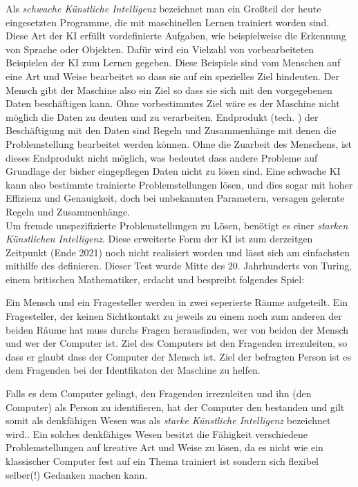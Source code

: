 \documentclass[12pt]{report}
\begin{document}
    Als \emph{schwache Künstliche Intelligenz} bezeichnet man ein Großteil der heute eingesetzten Programme, die mit
    maschinellen Lernen trainiert worden sind.\cite{ibm2021whatisAI} Diese Art der KI erfüllt vordefinierte Aufgaben,
    wie beispielweise die Erkennung von Sprache oder Objekten. Dafür wird ein Vielzahl von vorbearbeiteten Beispielen der KI
    zum Lernen gegeben. Diese Beispiele sind vom Menschen auf eine Art und Weise bearbeitet so dass sie auf ein spezielles Ziel hindeuten.
    Der Mensch gibt der Maschine also ein Ziel so dass sie sich mit den vorgegebenen Daten beschäftigen kann.
    Ohne vorbestimmtes Ziel wäre es der Maschine nicht möglich die Daten zu deuten und zu verarbeiten.
    Endprodukt (tech. ) der Beschäftigung mit den Daten sind Regeln und Zusammenhänge
    mit denen die Problemstellung bearbeitet werden können. Ohne die Zuarbeit des Menschens, ist dieses Endprodukt nicht
    möglich, was bedeutet dass andere Probleme auf Grundlage der bisher eingepflegen Daten nicht zu lösen sind.
    Eine schwache KI kann also bestimmte trainierte Problemstellungen lösen, und dies sogar mit hoher Effizienz und Genauigkeit, doch bei
    unbekannten Parametern, versagen gelernte Regeln und Zusammenhänge.\\

    Um fremde unspezifizierte Problemstellungen zu Lösen, benötigt es einer \emph{starken Künstlichen Intelligenz}.
    Diese erweiterte Form der KI ist zum derzeitgen Zeitpunkt (Ende 2021) noch nicht realisiert worden und lässt sich am
    einfachsten mithilfe des  definieren. Dieser Test wurde Mitte des 20. Jahrhunderts von
    Turing, einem britischen Mathematiker, erdacht und bespreibt folgendes Spiel:
    \begin{displayquote}
        Ein Mensch und ein Fragesteller werden in zwei seperierte
        Räume aufgeteilt. Ein Fragesteller, der keinen Sichtkontakt zu jeweils zu einem noch zum anderen der beiden Räume hat
        muss durchs Fragen herausfinden, wer von beiden der Mensch und wer der Computer ist.
        Ziel des Computers ist den Fragenden irrezuleiten, so dass er glaubt dass der Computer der Mensch ist.
        Ziel der befragten Person ist es dem Fragenden bei der Identfikaton der Maschine zu helfen.\cite{turing1950computing}
    \end{displayquote}
    Falls es dem Computer gelingt, den Fragenden irrezuleiten und ihn (den Computer) als Person zu identifieren, hat der Computer
    den  bestanden und gilt somit als denkfähigen Wesen was als \emph{starke Künstliche Intelligenz}
    bezeichnet wird.\cite{oppy&dowe2020turingtest}. Ein solches denkfähiges Wesen besitzt die Fähigkeit verschiedene Problemstellungen
    auf kreative Art und Weise zu lösen, da es nicht wie ein klassischer Computer fest auf ein Thema trainiert ist sondern
    sich flexibel selber(!) Gedanken machen kann.\\
\end{document}
